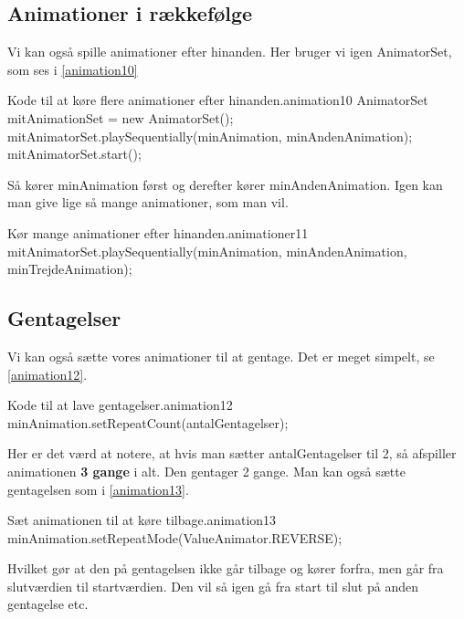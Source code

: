 \subsection{Animationer i rækkefølge}
Vi kan også spille animationer efter hinanden. Her bruger vi igen AnimatorSet, som ses i \autoref{animation10}
\begin{JavaCode}{Kode til at køre flere animationer efter hinanden.}{animation10}
	AnimatorSet mitAnimationSet = new AnimatorSet();
	mitAnimatorSet.playSequentially(minAnimation, minAndenAnimation);
	mitAnimatorSet.start();
\end{JavaCode}
Så kører minAnimation først og derefter kører minAndenAnimation. Igen kan man give lige så mange animationer, som man vil. 
\begin{JavaCode}{Kør mange animationer efter hinanden.}{animationer11}
	mitAnimatorSet.playSequentially(minAnimation, minAndenAnimation, minTrejdeAnimation);
\end{JavaCode}
\subsection{Gentagelser}
Vi kan også sætte vores animationer til at gentage. Det er meget simpelt, se \autoref{animation12}.
\begin{JavaCode}{Kode til at lave gentagelser.}{animation12}
	minAnimation.setRepeatCount(antalGentagelser);
\end{JavaCode}
Her er det værd at notere, at hvis man sætter antalGentagelser til 2, så afspiller animationen \textbf{3 gange} i alt. Den gentager 2 gange.
Man kan også sætte gentagelsen som i \autoref{animation13}.
\begin{JavaCode}{Sæt animationen til at køre tilbage.}{animation13}
	minAnimation.setRepeatMode(ValueAnimator.REVERSE);
\end{JavaCode}
Hvilket gør at den på gentagelsen ikke går tilbage og kører forfra, men går fra slutværdien til startværdien. Den vil så igen gå fra start til slut på anden gentagelse etc.

